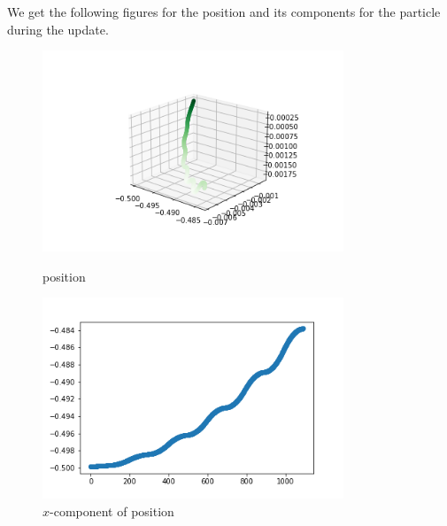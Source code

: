 \documentclass[12pt]{article}
\begin{document}
We get the following figures for the position and its components for the particle during the update.

\begin{figure}[H]
	\begin{multicols}{2}
		\includegraphics[width=\linewidth, height=6cm]{ps1.png} \caption{position} \label{ps1} \par
		\includegraphics[width=\linewidth, height=6cm]{psx1.png} \caption{$x$-component of position} \label{psx1} \par
	\end{multicols}
\end{figure}
\end{document}
